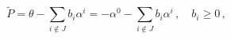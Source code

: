 \begin{equation}
\tilde{P} = \theta - \sum_{i \not\in J} b_i \alpha^i
= -\alpha^0 - \sum_{i \not\in J} b_i \alpha^i\,,
\quad b_i \ge 0\,,
\end{equation}

